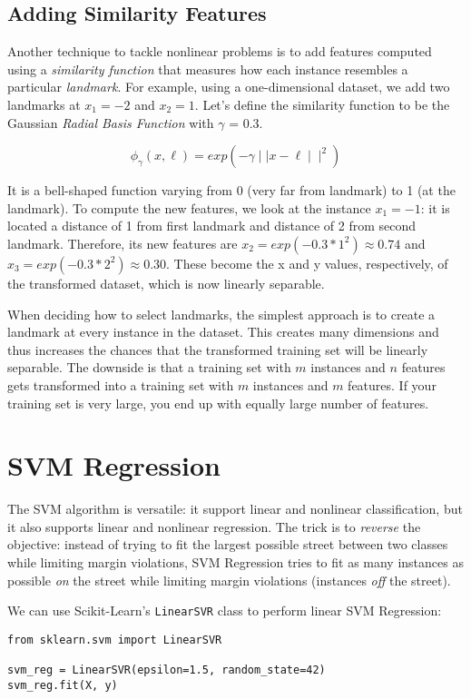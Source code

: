 \documentclass[letterpaper]{article}
\begin{document}
\subsection{Adding Similarity Features}
Another technique to tackle nonlinear problems is to add features computed using a \textsl{similarity function} that measures how each instance resembles a particular \textsl{landmark}. For example, using a one-dimensional dataset, we add two landmarks at $x_{1} = -2$ and $x_{2} = 1$. Let's define the similarity function to be the Gaussian \textsl{Radial Basis Function} with $\gamma$ = 0.3. 

$$ \phi_{\gamma}(x, \ell) = exp(- \gamma \mid \mid x - \ell \mid \mid ^{2}) $$

It is a bell-shaped function varying from 0 (very far from landmark) to 1 (at the landmark). To compute the new features, we look at the instance $x_{1} = -1$: it is located a distance of 1 from first landmark and distance of 2 from second landmark. Therefore, its new features are $x_{2} = exp(-0.3 * 1^{2}) \approx 0.74$ and $x_{3} = exp(-0.3 * 2^{2}) \approx 0.30$. These become the x and y values, respectively, of the transformed dataset, which is now linearly separable. 

When deciding how to select landmarks, the simplest approach is to create a landmark at every instance in the dataset. This creates many dimensions and thus increases the chances that the transformed training set will be linearly separable. The downside is that a training set with $m$ instances and $n$ features gets transformed into a training set with $m$ instances and $m$ features. If your training set is very large, you end up with equally large number of features. 

\section{SVM Regression} 
The SVM algorithm is versatile: it support linear and nonlinear classification, but it also supports linear and nonlinear regression. The trick is to \textsl{reverse} the objective: instead of trying to fit the largest possible street between two classes while limiting margin violations, SVM Regression tries to fit as many instances as possible \textsl{on} the street while limiting margin violations (instances \textsl{off} the street). 

\newpage
We can use Scikit-Learn's \texttt{LinearSVR} class to perform linear SVM Regression: 
\begin{verbatim}
from sklearn.svm import LinearSVR

svm_reg = LinearSVR(epsilon=1.5, random_state=42)
svm_reg.fit(X, y)
\end{verbatim}
\end{document}
